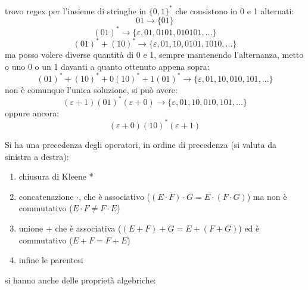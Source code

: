 \documentclass[a4paper,12pt, oneside]{book}
\begin{document}
\begin{definizione}
\begin{esempio}
		trovo regex per l'insieme di stringhe in $\{0,1\}^*$ che consistono in 0 e 1 alternati:\\
		$$01\to \{01\}$$
		$$(01)^*\to \{\varepsilon, 01, 0101,010101,...\}$$
		$$(01)^*+(10)^*\to\{\varepsilon, 01,10,0101,1010,...\}$$
		ma posso volere diverse quantità di 0 e 1, sempre mantenendo l'alternanza, metto o uno 0 o un 1 davanti a quanto ottenuto appena sopra:
		$$(01)^*+(10)^*+0(10)^*+1(01)^*\to \{\varepsilon,01,10,010,101,...\}$$
		non è comunque l'unica soluzione, si può avere:
		$$(\varepsilon+1)(01)^*(\varepsilon+0)\to \{\varepsilon,01,10,010,101,...\}$$
		oppure ancora:
		$$(\varepsilon+0)(10)^*(\varepsilon+1)$$
	\end{esempio}
\end{definizione}
Si ha una precedenza degli operatori, in ordine di precedenza (si valuta da sinistra a destra):
\begin{enumerate}
	\item chiusura di Kleene *
	\item concatenazione $\cdot$, che è associativo ($(E\cdot F)\cdot G=E\cdot (F\cdot G)$) ma non è commutativo ($E\cdot F\neq F\cdot E$)
	\item unione + che è associativa ($(E+ F)+ G=E+ (F+ G)$) ed è commutativo ($E+F= F+ E$)
	\item infine le parentesi
\end{enumerate}
si hanno anche delle proprietà algebriche:
\end{document}
